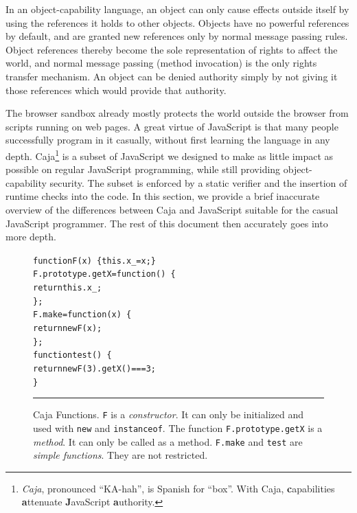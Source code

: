 \documentclass[letterpaper,twocolumn,10pt]{article}
\newcommand{\code}[1]{{\tt {#1}}}              %
\begin{document}
In an object-capability language, an object can only cause effects outside 
itself by using the references it holds to other objects. Objects have no 
powerful references by default, and are granted new references only by normal 
message passing rules. Object references thereby become the sole 
representation of rights to affect the world, and normal message passing 
(method invocation) is 
the only rights transfer mechanism. An object can be denied authority simply 
by not giving it those references which would provide that authority.

The browser sandbox already mostly protects the world outside the browser 
from scripts running on web pages. A great virtue of JavaScript is that many 
people successfully program in it casually, without first learning the 
language in any depth. Caja\footnote{
%
\emph{Caja}, pronounced ``KA-hah'', is Spanish for ``box''. With Caja, 
\textbf{c}apabilities \textbf{a}ttenuate \textbf{J}avaScript 
\textbf{a}uthority.
%
} is a subset of JavaScript we designed to make as little impact as 
possible on regular JavaScript programming, while still providing 
object-capability security.  The subset is enforced by a static verifier
and the insertion of runtime checks into the code.  In this section, we provide a brief inaccurate 
overview of the differences between Caja and JavaScript suitable for the 
casual JavaScript programmer. The rest of this document then accurately goes 
into more depth.

\begin{figure}[t!]
\begin{alltt}
function F(x)\ \{ this.x_ = x; \}
F.prototype.getX = function()\ \{
  return this.x_;
\};
F.make = function(x)\ \{
  return new F(x);
\};
function test()\ \{
  return new F(3).getX() === 3;
\}
\end{alltt}

\caption[Caja Functions]{Caja Functions. \code{F} is a \emph{constructor}. It 
can only be initialized and used with \code{new} and \code{instanceof}. 
The function \code{F.prototype.getX} is a \emph{method}. It can only be called as a 
method. \code{F.make} and \code{test} are \emph{simple functions}. They are
not restricted. \\ } \hrule
\label{fig:func-obj}
\end{figure}
\end{document}
